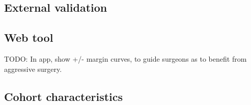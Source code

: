 \documentclass[dissertation.tex]{subfiles}
\begin{document}


\subsection{External validation}

\subsection{Web tool}


%

TODO: In app, show +/- margin curves, to guide surgeons as to benefit from aggressive surgery.


\subsection{Cohort characteristics}
\label{subsec:nomo-results-cohort}
\end{document}
